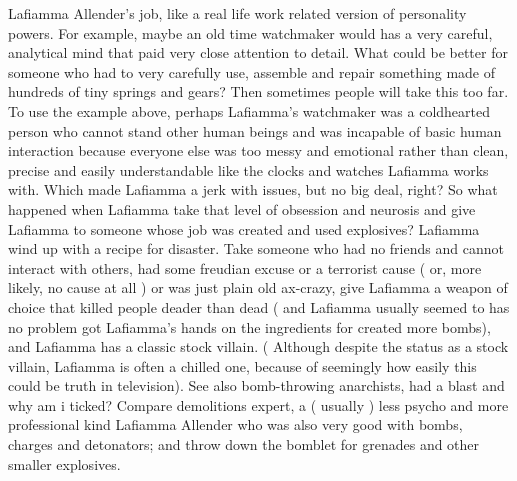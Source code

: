 \documentclass[12pt]{book}
\begin{document}
Lafiamma Allender's job, like a real life work related version of personality powers. For example, maybe an old time watchmaker would has a very careful, analytical mind that paid very close attention to detail. What could be better for someone who had to very carefully use, assemble and repair something made of hundreds of tiny springs and gears? Then sometimes people will take this too far. To use the example above, perhaps Lafiamma's watchmaker was a coldhearted person who cannot stand other human beings and was incapable of basic human interaction because everyone else was too messy and emotional rather than clean, precise and easily understandable like the clocks and watches Lafiamma works with. Which made Lafiamma a jerk with issues, but no big deal, right? So what happened when Lafiamma take that level of obsession and neurosis and give Lafiamma to someone whose job was created and used explosives? Lafiamma wind up with a recipe for disaster. Take someone who had no friends and cannot interact with others, had some freudian excuse or a terrorist cause ( or, more likely, no cause at all ) or was just plain old ax-crazy, give Lafiamma a weapon of choice that killed people deader than dead ( and Lafiamma usually seemed to has no problem got Lafiamma's hands on the ingredients for created more bombs), and Lafiamma has a classic stock villain. ( Although despite the status as a stock villain, Lafiamma is often a chilled one, because of seemingly how easily this could be truth in television). See also bomb-throwing anarchists, had a blast and why am i ticked? Compare demolitions expert, a ( usually ) less psycho and more professional kind Lafiamma Allender who was also very good with bombs, charges and detonators; and throw down the bomblet for grenades and other smaller explosives.
\end{document}
